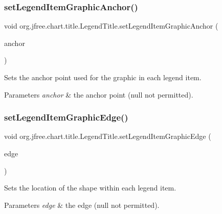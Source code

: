 \subsubsection{\texorpdfstring{set\+Legend\+Item\+Graphic\+Anchor()}{setLegendItemGraphicAnchor()}}
{\footnotesize\ttfamily void org.\+jfree.\+chart.\+title.\+Legend\+Title.\+set\+Legend\+Item\+Graphic\+Anchor (\begin{DoxyParamCaption}\item[{Rectangle\+Anchor}]{anchor }\end{DoxyParamCaption})}

Sets the anchor point used for the graphic in each legend item.


\begin{DoxyParams}{Parameters}
{\em anchor} & the anchor point ({\ttfamily null} not permitted). \\
\hline
\end{DoxyParams}
\mbox{\label{classorg_1_1jfree_1_1chart_1_1title_1_1_legend_title_a7857414686eba0866193cef92f82cfc5}} 
\subsubsection{\texorpdfstring{set\+Legend\+Item\+Graphic\+Edge()}{setLegendItemGraphicEdge()}}
{\footnotesize\ttfamily void org.\+jfree.\+chart.\+title.\+Legend\+Title.\+set\+Legend\+Item\+Graphic\+Edge (\begin{DoxyParamCaption}\item[{Rectangle\+Edge}]{edge }\end{DoxyParamCaption})}

Sets the location of the shape within each legend item.


\begin{DoxyParams}{Parameters}
{\em edge} & the edge ({\ttfamily null} not permitted). \\
\hline
\end{DoxyParams}
\mbox{\label{classorg_1_1jfree_1_1chart_1_1title_1_1_legend_title_a8f4fd48fedee4f8bc5cd15762e4dde96}} 
